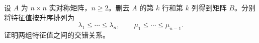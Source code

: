设 $A$ 为 $n\times n$ 实对称矩阵，$n\ge2$。删去 $A$ 的第 $k$ 行和第 $k$ 列得到矩阵 $B$。分别将特征值按升序排列为
\[
 \lambda_1\le\cdots\le\lambda_n,
 \qquad \mu_1\le\cdots\le\mu_{n-1}.
\]
证明两组特征值之间的交错关系。

